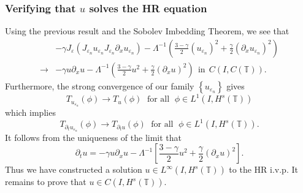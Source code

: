 \documentclass{beamer}
\newcommand{\p}{\partial}
\newcommand{\ci}{\mathbb{T}}
\newcommand{\ee}{\varepsilon}
\begin{document}
%
%
%
%
%
%
%
%
%
\begin{frame}
	\frametitle{Verifying that $u$ solves the HR equation} 
Using the previous result and the Sobolev Imbedding Theorem, we see that
%
%
%
%
\begin{equation*}
\begin{split}
& -\gamma J_\ee (J_{\ee_n} u_{\ee_n}  J_{\ee_n} \p_x
u_{\ee_n}) - \Lambda^{-1} \left( \frac{3-\gamma}{2}
(u_{\ee_n})^2
+ \frac{\gamma}{2} (\p_x u_{\ee_n})^2 \right )
\\
\to & -\gamma u \p_x u -
\Lambda^{-1} \left( \frac{3-\gamma}{2} u^2
+ \frac{\gamma}{2} (\p_x u)^2 \right ) \ \
\text{in} \ \ C(I, C(\ci)).
\label{loc-non-loc-tog}
\end{split}
\end{equation*}
%
%
Furthermore, the strong convergence of our family $\left\{ u_{\ee_n} 
\right\}$  gives 
%
%
%
\begin{equation*}
\label{weak-conv-2}
T_{u_{\ee_n}}(\phi)  \longrightarrow  T_u(\phi) \;
\text{ for all } \;  \phi \in L^1(I, H^{s}(\ci))
\end{equation*}
%
%
%
which implies
%
%
%
%
\begin{equation*}
\label{distib-conv-2}
T_{\p_t u_{\ee_n}}(\phi)  \longrightarrow  T_{\p_t u}(\phi) \;
\text{ for all } \;  \phi \in L^1(I, H^{s}(\ci)).
\end{equation*}
%
%
%
%
It follows from the uniqueness of the limit 
that
%
%
%
\begin{equation*}
\label{1000y}
\partial_t u =- \gamma u \partial_x u- \Lambda^{-1} \left
[\frac{3-\gamma}{2}u^2 + \frac{\gamma}{2}(\p_x u)^2 \right ].
\end{equation*}
%
%
%
Thus we have constructed a solution $u \in L^\infty(I, H^s(\ci))$
to the HR i.v.p. It remains to prove that $u \in C(I, H^s(\ci)).$

\end{frame}
%
%
%
%
%
\end{document}
